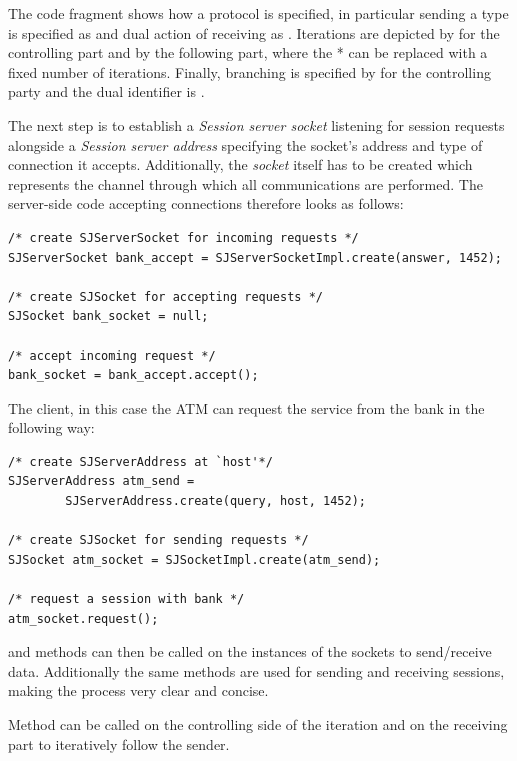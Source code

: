 The code fragment shows how a protocol is specified, in particular sending a type is specified as  and dual action of receiving as . Iterations are depicted by \LST{![...]*} for the controlling part and  by the following part, where the * can be replaced with a fixed number of iterations. Finally, branching is specified by  for the controlling party and the dual identifier is .

The next step is to establish a \textit{Session server socket} listening for session requests alongside a \textit{Session server address} specifying the socket's address and type of connection it accepts. Additionally, the \textit{socket} itself has to be created which represents the channel through which all communications are performed. The server-side code accepting connections therefore looks as follows:

\begin{lstlisting}[basicstyle=\LISTINGSTYLE]
/* create SJServerSocket for incoming requests */
SJServerSocket bank_accept = SJServerSocketImpl.create(answer, 1452);

/* create SJSocket for accepting requests */
SJSocket bank_socket = null;

/* accept incoming request */
bank_socket = bank_accept.accept();
\end{lstlisting}

The client, in this case the ATM can request the service from the bank in the following way:

\begin{lstlisting}[basicstyle=\LISTINGSTYLE]
/* create SJServerAddress at `host'*/
SJServerAddress atm_send =
        SJServerAddress.create(query, host, 1452);

/* create SJSocket for sending requests */
SJSocket atm_socket = SJSocketImpl.create(atm_send);

/* request a session with bank */
atm_socket.request();
\end{lstlisting}

 and  methods can then be called on the instances of the sockets to send/receive data. Additionally the same methods are used for sending and receiving sessions, making the process very clear and concise.

Method  can be called on the controlling side of the iteration and  on the receiving part to iteratively follow the sender.

